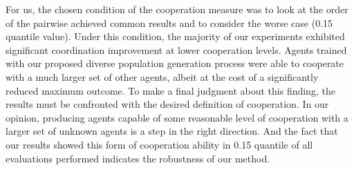 For us, the chosen condition of the cooperation measure was to look at the order of the pairwise achieved common results and to consider the worse case (0.15 quantile value).
Under this condition, the majority of our experiments exhibited significant coordination improvement at lower cooperation levels.
Agents trained with our proposed diverse population generation process were able to cooperate with a much larger set of other agents, albeit at the cost of a significantly reduced maximum outcome.
To make a final judgment about this finding, the results must be confronted with the desired definition of cooperation.
In our opinion, producing agents capable of some reasonable level of cooperation with a larger set of unknown agents is a step in the right direction.
And the fact that our results showed this form of cooperation ability in 0.15 quantile of all evaluations performed indicates the robustness of our method.


